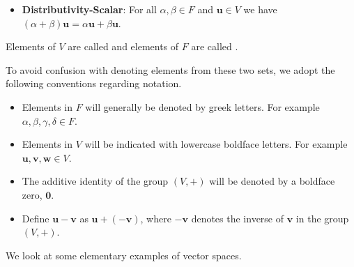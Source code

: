 \begin{definition}
\begin{itemize}
        \item \textbf{Distributivity-Scalar}: For all $\alpha, \beta \in F$ and $\mathbf{u} \in V$ we have $(\alpha+\beta)\mathbf{u} = \alpha\mathbf{u} + \beta\mathbf{u}$.
    \end{itemize}
    Elements of $V$ are called  and elements of $F$ are called .
\end{definition}

To avoid confusion with denoting elements from these two sets, we adopt the following conventions regarding notation.
\begin{itemize}
    \item Elements in $F$ will generally be denoted by greek letters. For example $\alpha, \beta, \gamma, \delta \in F$.
    \item Elements in $V$ will be indicated with lowercase boldface letters. For example $\mathbf{u}, \mathbf{v}, \mathbf{w} \in V$.
    \item The additive identity of the group $(V, +)$ will be denoted by a boldface zero, $\mathbf{0}$.
    \item Define $\mathbf{u} - \mathbf{v}$ as $\mathbf{u} + (-\mathbf{v})$, where $-\mathbf{v}$ denotes the inverse of $\mathbf{v}$ in the group $(V, +)$.
\end{itemize}

We look at some elementary examples of vector spaces.

